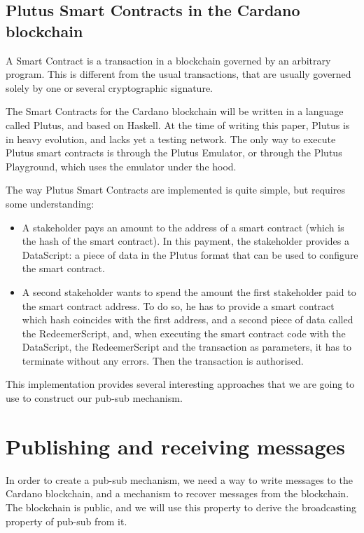 \documentclass{article}
\begin{document}
\subsection{Plutus Smart Contracts in the Cardano blockchain}
A Smart Contract is a transaction in a blockchain governed by an arbitrary program. This is different from the usual transactions, that are usually governed solely by one or several cryptographic signature.

The Smart Contracts for the Cardano blockchain will be written in a language called Plutus, and based on Haskell. At the time of writing this paper, Plutus is in heavy evolution, and lacks yet a testing network. The only way to execute Plutus smart contracts is through the Plutus Emulator, or through the Plutus Playground, which uses the emulator under the hood.

The way Plutus Smart Contracts are implemented is quite simple, but requires some understanding:

\begin{itemize}
\item A stakeholder pays an amount to the address of a smart contract (which is the hash of the smart contract). In this payment, the stakeholder provides a DataScript: a piece of data in the Plutus format that can be used to configure the smart contract.
\item A second stakeholder wants to spend the amount the first stakeholder paid to the smart contract address. To do so, he has to provide a smart contract which hash coincides with the first address, and a second piece of data called the RedeemerScript, and, when executing the smart contract code with the DataScript, the RedeemerScript and the transaction as parameters, it has to terminate without any errors. Then the transaction is authorised.
\end{itemize}

This implementation provides several interesting approaches that we are going to use to construct our pub-sub mechanism.

\section{Publishing and receiving messages}

In order to create a pub-sub mechanism, we need a way to write messages to the Cardano blockchain, and a mechanism to recover messages from the blockchain. The blockchain is public, and we will use this property to derive the broadcasting property of pub-sub from it.
\end{document}
